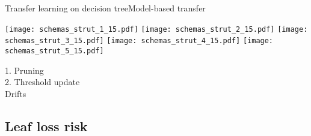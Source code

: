 \begin{frame}{Transfer learning on decision tree}{Model-based transfer}
\begin{minipage}[t]{0.49\linewidth}
    \renewcommand{\ratio}{0.55}
    \begin{overprint}
        \centering\texttt{[image: schemas\_strut\_1\_15.pdf]}
        \centering\texttt{[image: schemas\_strut\_2\_15.pdf]}
        \centering\texttt{[image: schemas\_strut\_3\_15.pdf]}
        \centering\texttt{[image: schemas\_strut\_4\_15.pdf]}
        \centering\texttt{[image: schemas\_strut\_5\_15.pdf]}
    \end{overprint}
    \textcolor{myorange}{1. Pruning}\\
    \textcolor{myblue}{2. Threshold update}\\
    \bigskip
    Drifts
\end{minipage}

\end{frame}

\subsection{Leaf loss risk}


